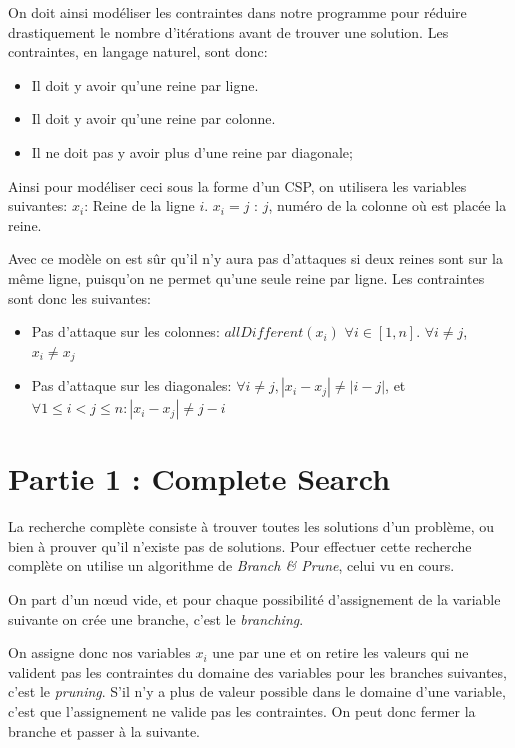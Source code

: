 \documentclass{article}
\begin{document}
On doit ainsi modéliser les contraintes dans notre programme pour réduire drastiquement le nombre d'itérations avant de trouver une solution. Les contraintes, en langage naturel, sont donc:

\begin{itemize}
\item Il doit y avoir qu'une reine par ligne.
\item Il doit y avoir qu'une reine par colonne.
\item Il ne doit pas y avoir plus d'une reine par diagonale;
\end{itemize}

Ainsi pour modéliser ceci sous la forme d'un CSP, on utilisera les variables suivantes:
$x_i$: Reine de la ligne $i$.
$x_i = j$ : $j$, numéro de la colonne où est placée la reine.

Avec ce modèle on est sûr qu'il n'y aura pas d'attaques si deux reines sont sur la même ligne, puisqu'on ne permet qu'une seule reine par ligne.
Les contraintes sont donc les suivantes:
\begin{itemize}
\item Pas d'attaque sur les colonnes: $allDifferent(x_i)$ $\forall i \in [1, n]$. $\forall i \neq j$, $x_i \neq x_j$

\item Pas d'attaque sur les diagonales:  $\forall i \neq j, |x_i - x_j| \neq |i - j|$, et $\forall  1 \leq i < j \leq n : |x_i - x_j | \neq j - i$
\end{itemize}


\section{Partie 1 : Complete Search}

La recherche complète consiste à trouver toutes les solutions d'un problème, ou bien à prouver qu'il n'existe pas de solutions. 
Pour effectuer cette recherche complète on utilise un algorithme de \emph{Branch \& Prune}, celui vu en cours. 

On part d'un nœud vide, et pour chaque possibilité d'assignement de la variable suivante on crée une branche, c'est le \emph{branching}.

On assigne donc nos variables $x_i$ une par une et on retire les valeurs qui ne valident pas les contraintes du domaine des variables pour les branches suivantes, c'est le \emph{pruning}. S'il n'y a plus de valeur possible dans le domaine d'une variable, c'est que l'assignement ne valide pas les contraintes. On peut donc fermer la branche et passer à la suivante.
\end{document}
